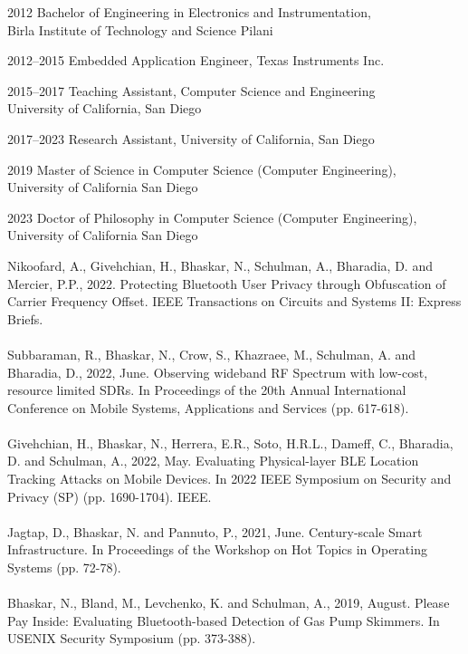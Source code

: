 \begin{vita}
    \noindent
    \begin{cv}{}
    \begin{cvlist}{}
    \item[2012] Bachelor of Engineering in Electronics and Instrumentation, \\
    Birla Institute of Technology and Science Pilani
    \item[2012--2015] Embedded Application Engineer, Texas Instruments Inc.
    \item[2015--2017] Teaching Assistant, Computer Science and Engineering\\University of California, San Diego
    \item[2017--2023] Research Assistant, University of California, San
    Diego
    \item[2019] Master of Science in Computer Science (Computer Engineering), \\
    University of California San Diego
    \item[2023] Doctor of Philosophy in Computer Science (Computer Engineering), \\
    University of California San Diego
    \end{cvlist}
    \end{cv}
    
    \publications
    
    \noindent Nikoofard, A., Givehchian, H., Bhaskar, N., Schulman, A., Bharadia, D. and Mercier, P.P., 2022. Protecting Bluetooth User Privacy through Obfuscation of Carrier Frequency Offset. IEEE Transactions on Circuits and Systems II: Express Briefs.
    \\~\\
    \noindent Subbaraman, R., Bhaskar, N., Crow, S., Khazraee, M., Schulman, A. and Bharadia, D., 2022, June. Observing wideband RF Spectrum with low-cost, resource limited SDRs. In Proceedings of the 20th Annual International Conference on Mobile Systems, Applications and Services (pp. 617-618).
    \\~\\
    \noindent Givehchian, H., Bhaskar, N., Herrera, E.R., Soto, H.R.L., Dameff, C., Bharadia, D. and Schulman, A., 2022, May. Evaluating Physical-layer BLE Location Tracking Attacks on Mobile Devices. In 2022 IEEE Symposium on Security and Privacy (SP) (pp. 1690-1704). IEEE.
    \\~\\
    \noindent Jagtap, D., Bhaskar, N. and Pannuto, P., 2021, June. Century-scale Smart Infrastructure. In Proceedings of the Workshop on Hot Topics in Operating Systems (pp. 72-78).
    \\~\\
    \noindent Bhaskar, N., Bland, M., Levchenko, K. and Schulman, A., 2019, August. Please Pay Inside: Evaluating Bluetooth-based Detection of Gas Pump Skimmers. In USENIX Security Symposium (pp. 373-388).
\end{vita}
